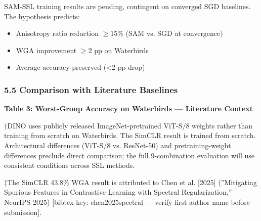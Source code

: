 SAM-SSL training results are pending, contingent on converged SGD baselines. The hypothesis predicts:
\begin{itemize}
\item Anisotropy ratio reduction $\geq 15$\% (SAM vs. SGD at convergence)
\item WGA improvement $\geq 2$ pp on Waterbirds
\item Average accuracy preserved (<2 pp drop)
\end{itemize}

\subsubsection{5.5 Comparison with Literature Baselines}

\textbf{Table 3: Worst-Group Accuracy on Waterbirds --- Literature Context}

\begin{table}[htbp]
\centering
{}
\end{table}

†DINO uses publicly released ImageNet-pretrained ViT-S/8 weights rather than training from scratch on Waterbirds. The SimCLR result \citep{Chen2025} is trained from scratch. Architectural differences (ViT-S/8 vs. ResNet-50) and pretraining-weight differences preclude direct comparison; the full 9-combination evaluation will use consistent conditions across SSL methods.

‡The SimCLR 43.8\% WGA result is attributed to Chen et al. [2025] (''Mitigating Spurious Features in Contrastive Learning with Spectral Regularization,'' NeurIPS 2025) [bibtex key: chen2025spectral --- verify first author name before submission].


